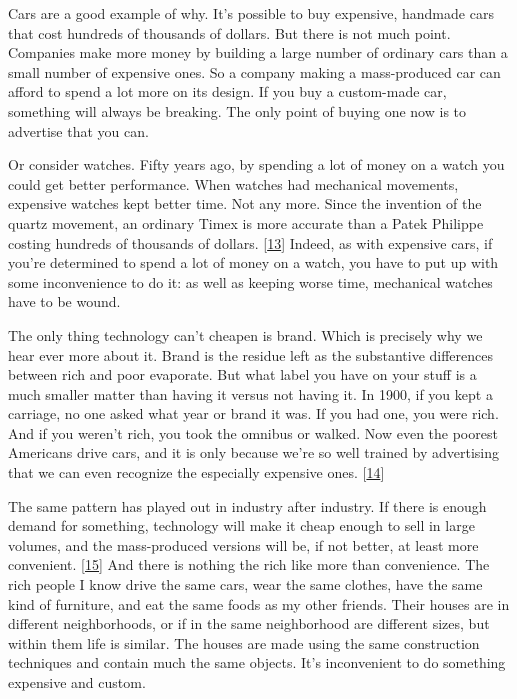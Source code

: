Cars are a good example of why. It's possible to buy expensive, handmade
cars that cost hundreds of thousands of dollars. But there is not much
point. Companies make more money by building a large number of ordinary
cars than a small number of expensive ones. So a company making a
mass-produced car can afford to spend a lot more on its design. If you
buy a custom-made car, something will always be breaking. The only point
of buying one now is to advertise that you can.

Or consider watches. Fifty years ago, by spending a lot of money on a
watch you could get better performance. When watches had mechanical
movements, expensive watches kept better time. Not any more. Since the
invention of the quartz movement, an ordinary Timex is more accurate
than a Patek Philippe costing hundreds of thousands of dollars.
{[}\hyperref[f13n]{13}{]} Indeed, as with expensive cars, if you're
determined to spend a lot of money on a watch, you have to put up with
some inconvenience to do it: as well as keeping worse time, mechanical
watches have to be wound.

The only thing technology can't cheapen is brand. Which is precisely why
we hear ever more about it. Brand is the residue left as the substantive
differences between rich and poor evaporate. But what label you have on
your stuff is a much smaller matter than having it versus not having it.
In 1900, if you kept a carriage, no one asked what year or brand it was.
If you had one, you were rich. And if you weren't rich, you took the
omnibus or walked. Now even the poorest Americans drive cars, and it is
only because we're so well trained by advertising that we can even
recognize the especially expensive ones. {[}\hyperref[f14n]{14}{]}

The same pattern has played out in industry after industry. If there is
enough demand for something, technology will make it cheap enough to
sell in large volumes, and the mass-produced versions will be, if not
better, at least more convenient. {[}\hyperref[f15n]{15}{]} And there is
nothing the rich like more than convenience. The rich people I know
drive the same cars, wear the same clothes, have the same kind of
furniture, and eat the same foods as my other friends. Their houses are
in different neighborhoods, or if in the same neighborhood are different
sizes, but within them life is similar. The houses are made using the
same construction techniques and contain much the same objects. It's
inconvenient to do something expensive and custom.

